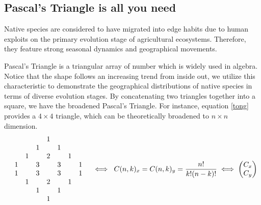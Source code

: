 \documentclass[12pt]{article}
\begin{document}
	\subsection{Pascal's Triangle is all you need}
	\hspace{1.5em}Native species are considered to have migrated into edge habits due to human exploits on the primary evolution stage of agricultural ecosystems. Therefore, they feature strong seasonal dynamics and geographical movements.
	
	Pascal's Triangle is a triangular array of number which is widely used in algebra. Notice that the shape follows an increasing trend from inside out, we utilize this characteristic to demonstrate the geographical distributions of native species in terms of diverse evolution stages. By concatenating two triangles together into a square, we have the broadened Pascal's Triangle. For instance, equation \ref{tong} provides a $4\times4$ triangle, which can be theoretically broadened to $n\times n$ dimension.
	\begin{equation}
		\begin{matrix}
			& & & &1 & & & & \\
			& & &1&  &1& & & \\
			& &1& &2 & &1 & & \\
			&1& &3&  &3&  &1 & \\ 
			&1& &3&  &3&  &1 & \\ 
			& &1& &2 & &1 & & \\
			& & &1&  &1& & & \\
			& & & &1 & & & & \\
		\end{matrix}\hspace{0.2em} \iff\hspace{0.3em}C(n,k)_x=C(n,k)_y=\frac{n!}{k!(n-k)!}\iff\begin{pmatrix}
			C_x \\C_y
		\end{pmatrix}
		\label{tong}
	\end{equation}
	
\end{document}
